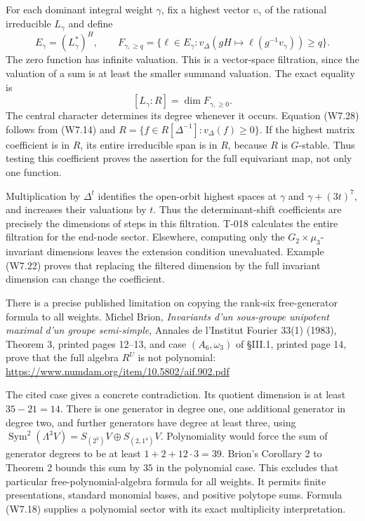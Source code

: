 \documentclass[
  10pt,
]{article}
\begin{document}
For each dominant integral weight \(\gamma\), fix a highest vector
\(v_\gamma\) of the rational irreducible \(L_\gamma\) and define \[
E_\gamma=(L_\gamma^*)^H,\qquad
F_{\gamma,\ge q}=
\{\ell\in E_\gamma:
v_\Delta(gH\mapsto\ell(g^{-1}v_\gamma))\ge q\}.
\tag{W7.27}
\] The zero function has infinite valuation. This is a vector-space
filtration, since the valuation of a sum is at least the smaller summand
valuation. The exact equality is \[
[L_\gamma:R]=\dim F_{\gamma,\ge0}.
\tag{W7.28}
\] The central character determines its degree whenever it occurs.
Equation (W7.28) follows from (W7.14) and
\(R=\{f\in R[\Delta^{-1}]:v_\Delta(f)\ge0\}\). If the highest matrix
coefficient is in \(R\), its entire irreducible span is in \(R\),
because \(R\) is \(G\)-stable. Thus testing this coefficient proves the
assertion for the full equivariant map, not only one function.

Multiplication by \(\Delta^t\) identifies the open-orbit highest spaces
at \(\gamma\) and \(\gamma+(3t)^7\), and increases their valuations by
\(t\). Thus the determinant-shift coefficients are precisely the
dimensions of steps in this filtration. T-018 calculates the entire
filtration for the end-node sector. Elsewhere, computing only the
\(G_2\times\mu_3\)-invariant dimensions leaves the extension condition
unevaluated. Example (W7.22) proves that replacing the filtered
dimension by the full invariant dimension can change the coefficient.

There is a precise published limitation on copying the rank-six
free-generator formula to all weights. Michel Brion, \emph{Invariants
d'un sous-groupe unipotent maximal d'un groupe semi-simple}, Annales de
l'Institut Fourier 33(1) (1983), Theorem 3, printed pages 12--13, and
case \((A_6,\omega_3)\) of §III.1, printed page 14, prove that the full
algebra \(R^U\) is not polynomial:
\url{https://www.numdam.org/item/10.5802/aif.902.pdf}

The cited case gives a concrete contradiction. Its quotient dimension is
at least \(35-21=14\). There is one generator in degree one, one
additional generator in degree two, and further generators have degree
at least three, using
\(\operatorname{Sym}^2(\Lambda^3V)=S_{(2^3)}V\oplus S_{(2,1^4)}V\).
Polynomiality would force the sum of generator degrees to be at least
\(1+2+12\cdot3=39\). Brion's Corollary 2 to Theorem 2 bounds this sum by
\(35\) in the polynomial case. This excludes that particular
free-polynomial-algebra formula for all weights. It permits finite
presentations, standard monomial bases, and positive polytope sums.
Formula (W7.18) supplies a polynomial sector with its exact multiplicity
interpretation.
\end{document}
